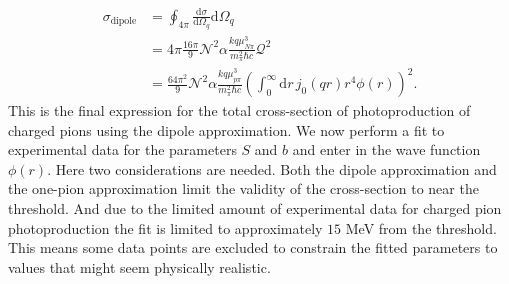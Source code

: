 \begin{align}
	\sigma_\text{dipole} & = \oint_{4\pi} \frac{\text{d}\sigma}{\text{d}\Omega_q} \text{d}\Omega_q \\
	&= 4\pi \frac{16 \pi}{9} \mathcal{N}^2 \alpha\frac{kq\mu^3_{N\pi}}{m_\pi^2 \hbar c}\mathcal{Q}^2 \\
	&= \frac{64\pi^2}{9}\mathcal{N}^2 \alpha \frac{kq\mu^3_{p\pi}}{m_\pi^2 \hbar c} \left( \int_0^\infty \text{d}r \, j_0(qr)r^4 \phi(r)\right)^2 \label{dipoletotalcross}.
\end{align}
This is the final expression for the total cross-section of photoproduction of charged pions using the dipole approximation. We now perform a fit to experimental data for the parameters $S$ and $b$ and enter in the wave function $\phi(r)$. Here two considerations are needed. Both the dipole approximation and the one-pion approximation limit the validity of the cross-section to near the threshold. And due to the limited amount of experimental data for charged pion photoproduction the fit is limited to approximately $15$ MeV from the threshold. This means some data points are excluded to constrain the fitted parameters to values that might seem physically realistic. 


